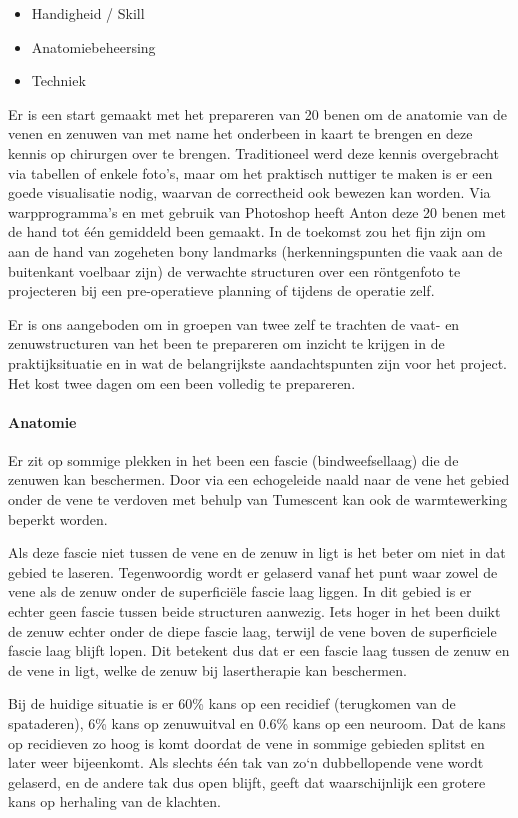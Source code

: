 \begin{itemize}
	\item Handigheid / Skill 
	\item Anatomiebeheersing 
	\item Techniek 
\end{itemize}

Er is een start gemaakt met het prepareren van 20 benen om de anatomie van de venen en zenuwen van met name het onderbeen in kaart te brengen en deze kennis op chirurgen over te brengen.
Traditioneel werd deze kennis overgebracht via tabellen of enkele foto's, maar om het praktisch nuttiger te maken is er een goede visualisatie nodig, waarvan de correctheid ook bewezen kan worden.
Via warpprogramma's en met gebruik van Photoshop heeft Anton deze 20 benen met de hand tot \'e\'en gemiddeld been gemaakt.
In de toekomst zou het fijn zijn om aan de hand van zogeheten bony landmarks (herkenningspunten die vaak aan de buitenkant voelbaar zijn) de verwachte structuren over een r\"ontgenfoto te projecteren bij een pre-operatieve planning of tijdens de operatie zelf. 

Er is ons aangeboden om in groepen van twee zelf te trachten de vaat- en zenuwstructuren van het been te prepareren om inzicht te krijgen in de praktijksituatie en in wat de belangrijkste aandachtspunten zijn voor het project. Het kost twee dagen om een been volledig te prepareren. 

\paragraph{Anatomie}
Er zit op sommige plekken in het been een fascie (bindweefsellaag) die de zenuwen kan beschermen.
Door via een echogeleide naald naar de vene het gebied onder de vene te verdoven met behulp van Tumescent kan ook de warmtewerking beperkt worden.

Als deze fascie niet tussen de vene en de zenuw in ligt is het beter om niet in dat gebied te laseren.
Tegenwoordig wordt er gelaserd vanaf het punt waar zowel de vene als de zenuw onder de superfici\"ele fascie laag liggen.
In dit gebied is er echter geen fascie tussen beide structuren aanwezig.
Iets hoger in het been duikt de zenuw echter onder de diepe fascie laag, terwijl de vene boven de superficiele fascie laag blijft lopen.
Dit betekent dus dat er een fascie laag tussen de zenuw en de vene in ligt, welke de zenuw bij lasertherapie kan beschermen.

Bij de huidige situatie is er 60\% kans op een recidief (terugkomen van de spataderen), 6\% kans op zenuwuitval en 0.6\% kans op een neuroom.
Dat de kans op recidieven zo hoog is komt doordat de vene in sommige gebieden splitst en later weer bijeenkomt.
Als slechts \'e\'en tak van zo`n dubbellopende vene wordt gelaserd, en de andere tak dus open blijft, geeft dat waarschijnlijk een grotere kans op herhaling van de klachten. 


